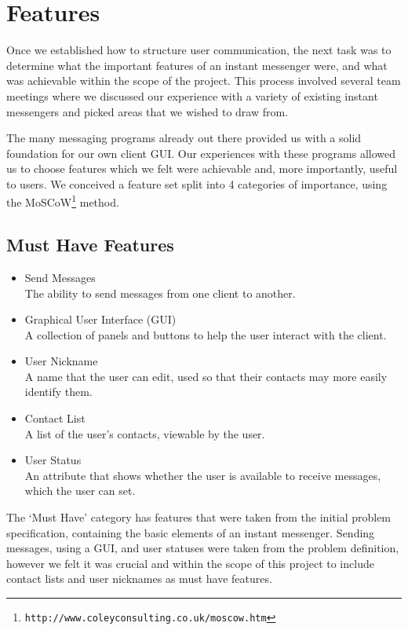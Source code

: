 \section{Features}
\label{features}

Once we established how to structure user communication, the next task was to determine what the important features of an instant messenger were, and what was achievable within the scope of the project. This process involved several team meetings where we discussed our experience with a variety of existing instant messengers and picked areas that we wished to draw from.

The many messaging programs already out there provided us with a solid foundation for our own client GUI. Our experiences with these programs allowed us to choose features which we felt were achievable and, more importantly, useful to users. We conceived a feature set split into 4 categories of importance, using the MoSCoW\footnote{\texttt{http://www.coleyconsulting.co.uk/moscow.htm}} method.

\subsection*{Must Have Features}

\begin{itemize}
\item{Send Messages\\
	The ability to send messages from one client to another.}
\item{Graphical User Interface (GUI)\\
	A collection of panels and buttons to help the user interact with the client.}
\item{User Nickname\\
	A name that the user can edit, used so that their contacts may more easily identify them.}
\item{Contact List\\
	A list of the user's contacts, viewable by the user.}
\item{User Status\\
	An attribute that shows whether the user is available to receive messages, which the user can set.}
\end{itemize}

The `Must Have' category has features that were taken from the initial problem specification, containing the basic elements of an instant messenger. Sending messages, using a GUI, and user statuses were taken from the problem definition, however we felt it was crucial and within the scope of this project to include contact lists and user nicknames as must have features.

